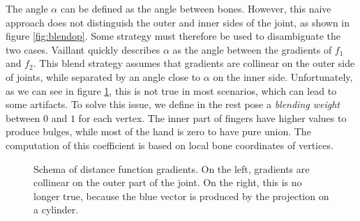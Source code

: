 \documentclass[a4paper,10pt]{article}
\begin{document}
\begin{multicols}{2}
The angle $\alpha$ can be defined as the angle between bones.
However, this naive approach does not distinguish the outer and inner sides of the joint, as shown in figure \ref{fig:blendop}.
Some strategy must therefore be used to disambiguate the two cases.
Vaillant quickly describes $\alpha$ as the angle between the gradients of $f_1$ and $f_2$.
This blend strategy assumes that gradients are collinear on the outer side of joints, while separated by an angle close to $\alpha$ on the inner side.
Unfortunately, as we can see in figure \ref{fig:blendstratschema}, this is not true in most scenarios, which can lead to some artifacts.
To solve this issue, we define in the rest pose a \emph{blending weight} between $0$ and $1$ for each vertex.
The inner part of fingers have higher values to produce bulges, while most of the hand is zero to have pure union.
The computation of this coefficient is based on local bone coordinates of vertices.

\begin{figure}[H]
\centering
{}
\qquad
{}
\caption{Schema of distance function gradients.
On the left, gradients are collinear on the outer part of the joint.
On the right, this is no longer true, because the blue vector is produced by the projection on a cylinder.}
\label{fig:blendstratschema}
\end{figure}


\end{multicols}
\end{document}
